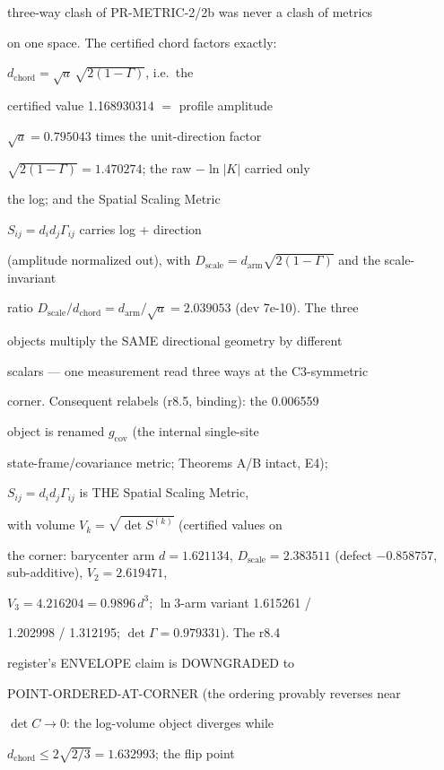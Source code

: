 \documentclass[11pt,a4paper]{article}
\theoremstyle{definition}
\begin{document}
    three-way clash of PR-METRIC-2/2b was never a clash of metrics

    on one space. The certified chord factors exactly:

    $d_{\mathrm{chord}} = \sqrt{a}\,\sqrt{2(1-\Gamma)}$, i.e.\ the

    certified value 1.168930314 $=$ profile amplitude

    $\sqrt{a} = 0.795043$ times the unit-direction factor

    $\sqrt{2(1-\Gamma)} = 1.470274$; the raw $-\ln|K|$ carried only

    the log; and the Spatial Scaling Metric

    $S_{ij} = d_i d_j \Gamma_{ij}$ carries log + direction

    (amplitude normalized out), with $D_{\mathrm{scale}} =
    d_{\mathrm{arm}}\sqrt{2(1-\Gamma)}$ and the scale-invariant

    ratio $D_{\mathrm{scale}}/d_{\mathrm{chord}} =
    d_{\mathrm{arm}}/\sqrt{a} = 2.039053$ (dev 7e-10). The three

    objects multiply the SAME directional geometry by different

    scalars --- one measurement read three ways at the C3-symmetric

    corner. Consequent relabels (r8.5, binding): the 0.006559

    object is renamed $g_{\mathrm{cov}}$ (the internal single-site

    state-frame/covariance metric; Theorems A/B intact, E4);

    $S_{ij} = d_i d_j \Gamma_{ij}$ is THE Spatial Scaling Metric,

    with volume $V_k = \sqrt{\det S^{(k)}}$ (certified values on

    the corner: barycenter arm $d = 1.621134$, $D_{\mathrm{scale}} =
    2.383511$ (defect $-0.858757$, sub-additive), $V_2 = 2.619471$,

    $V_3 = 4.216204 = 0.9896\,d^3$; $\ln 3$-arm variant 1.615261 /

    1.202998 / 1.312195; $\det\Gamma = 0.979331$). The r8.4

    register's ENVELOPE claim is DOWNGRADED to

    POINT-ORDERED-AT-CORNER (the ordering provably reverses near

    $\det C \to 0$: the log-volume object diverges while

    $d_{\mathrm{chord}} \le 2\sqrt{2/3} = 1.632993$; the flip point
\end{document}
